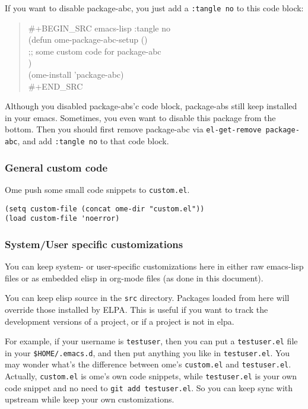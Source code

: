 \documentclass[11pt]{article}
\begin{document}
If you want to disable package-abc, you just add a \texttt{:tangle no} to this code
block:

\begin{verse}
\#+BEGIN\_SRC emacs-lisp :tangle no \\
(defun ome-package-abc-setup () \\
\hspace*{2em};; some custom code for package-abc \\
\hspace*{2em}) \\
\vspace*{1em}
(ome-install 'package-abc) \\
\#+END\_SRC \\
\end{verse}

Although you disabled package-abs'c code block, package-abs still keep
installed in your emacs. Sometimes, you even want to disable this package from
the bottom. Then you should first remove package-abc via \texttt{el-get-remove
package-abc}, and add \texttt{:tangle no} to that code block.

\subsubsection*{General custom code}
\label{sec-4-1-2}

Ome push some small code snippets to \texttt{custom.el}.

\begin{verbatim}
(setq custom-file (concat ome-dir "custom.el"))
(load custom-file 'noerror)
\end{verbatim}

\subsubsection*{System/User specific customizations}
\label{sec-4-1-3}
You can keep system- or user-specific customizations here in either raw
emacs-lisp files or as embedded elisp in org-mode files (as done in this
document).

You can keep elisp source in the \texttt{src} directory. Packages loaded from here
will override those installed by ELPA.  This is useful if you want to track the
development versions of a project, or if a project is not in elpa.

For example, if your username is \texttt{testuser}, then you can put a \texttt{testuser.el}
file in your \texttt{\$HOME/.emacs.d}, and then put anything you like in
\texttt{testuser.el}. You may wonder what's the difference between ome's \texttt{custom.el}
and \texttt{testuser.el}. Actually, \texttt{custom.el} is ome's own code snippets, while
\texttt{testuser.el} is your own code snippet and no need to \texttt{git add testuser.el}. So
you can keep sync with upstream while keep your own customizations.
\end{document}
